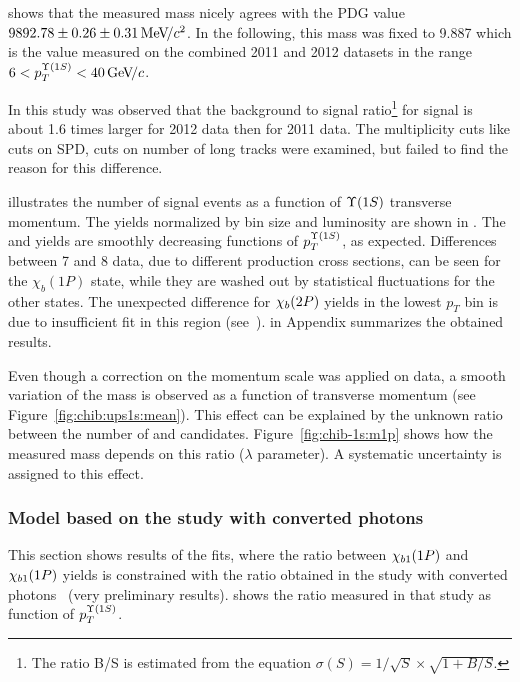  shows that the measured \chiboneOneP mass
nicely agrees with the PDG value $9892.78 \pm 0.26 \pm 0.31 {\mathrm{\,Me\kern -0.1em V\!/}c^2}$. In
the following, this mass was fixed to 9.887 \gevcc which is the value 
measured on the combined 2011 and 2012 datasets in the range $6<p_T^{\Y1S}<40\gevc$.

In this study was observed that the background to signal ratio\footnote{ The
ratio B/S is estimated  from the equation $\sigma(S) = 1/\sqrt{S} \times
\sqrt{1 + B/S}$. } for \chibThreeP signal  is about 1.6 times
larger for 2012 data then for 2011 data. The multiplicity cuts like cuts on
SPD, cuts on number of long tracks were examined, but failed to find the reason
for this difference.



 illustrates the number of signal events as
a function of $\Y1S$ transverse momentum. The yields
normalized by bin size and luminosity are shown in
. The \chibOneP and \chibThreeP yields
are smoothly decreasing functions of $p_T^{\Y1S}$, as expected. Differences between 7 and 8\tev
data, due to different production cross sections, can be seen for the
$\chi_b(1P)$ state, while they are washed out by statistical fluctuations for
the other states. The unexpected difference for $\chi_{b}(2P)$ yields in the lowest
$p_T$ bin is due to insufficient fit in this region (see~).
 in Appendix summarizes the
obtained results.



Even though a correction on the momentum scale was applied on data, a smooth variation of the
\chiboneOneP mass is observed as a function of transverse momentum (see
Figure~\ref{fig:chib:ups1s:mean}). This effect can be explained by the unknown
ratio between the number of \chiboneOneP and \chiboneTwoP candidates.
Figure~\ref{fig:chib-1s:m1p} shows how the measured mass depends on this ratio
($\lambda$ parameter). A systematic uncertainty is assigned to this effect.




\subsubsection{Model based on the study with converted photons}
This section shows results of the fits, where the ratio between
$\chi_{b 1}(1P)$ and $\chi_{b 1}(1P)$ yields is constrained with the ratio obtained
in the study with converted photons~\cite{Lespinasse:1664279} (very preliminary
results).  shows the ratio measured in that study as function
of $p_T^{\Y1S}$.

